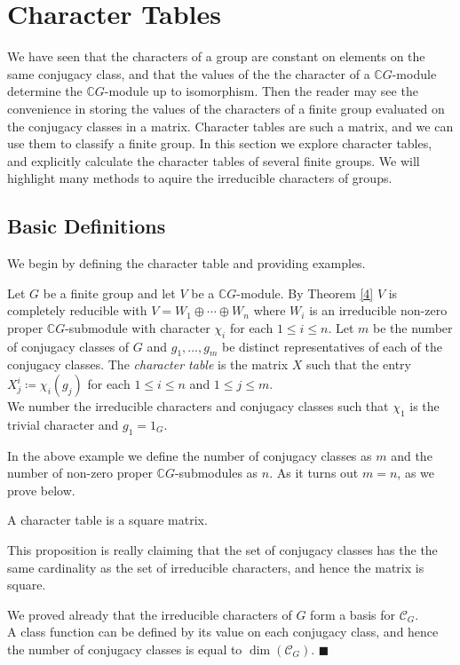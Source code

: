 \documentclass[../Project.tex]{subfiles}
\begin{document}
\newpage
\section{Character Tables}
We have seen that the characters of a group are constant on elements on the same conjugacy class, and that the values of the the character of a $\mathbb{C}G$-module determine the $\mathbb{C}G$-module up to isomorphism. Then the reader may see the convenience in storing the values of the characters of a finite group evaluated on the conjugacy classes in a matrix. Character tables are such a matrix, and we can use them to classify a finite group. In this section we explore character tables, and explicitly calculate the character tables of several finite groups. We will highlight many methods to aquire the irreducible characters of groups.
\subsection{Basic Definitions}
We begin by defining the character table and providing examples.
\begin{defi}
	Let $G$ be a finite group and let $V$ be a $\mathbb{C}G$-module. By Theorem \ref{4} $V$ is completely reducible with $V = W_1 \oplus \cdots \oplus W_n$ where $W_i$ is an irreducible non-zero proper $\mathbb{C}G$-submodule with character $\chi_i$ for each $1 \leqslant i \leqslant n$. Let $m$ be the number of conjugacy classes of $G$ and $g_1,\dots,g_m$ be distinct representatives of each of the conjugacy classes. The \textit{character table} is the matrix $X$ such that the entry $X^i_j \coloneqq \chi_i(g_j)$ for each $1 \leqslant i \leqslant n$ and $1 \leqslant j \leqslant m$.\\

	We number the irreducible characters and conjugacy classes such that $\chi_1$ is the trivial character and $g_1 = 1_G$.
\end{defi}

In the above example we define the number of conjugacy classes as $m$ and the number of non-zero proper $\mathbb{C}G$-submodules as $n$. As it turns out $m = n$, as we prove below.

\begin{prop}[{\cite[Theorem 15.3]{2}}]
	A character table is a square matrix.
\end{prop}
This proposition is really claiming that the set of conjugacy classes has the the same cardinality as the set of irreducible characters, and hence the matrix is square.
\begin{proo*}
	We proved already that the irreducible characters of $G$ form a basis for $\mathcal{C}_G$.\\

	A class function can be defined by its value on each conjugacy class, and hence the number of conjugacy classes is equal to $\dim(\mathcal{C}_G)$. \hfill$\blacksquare$\\
\end{proo*}
\end{document}
